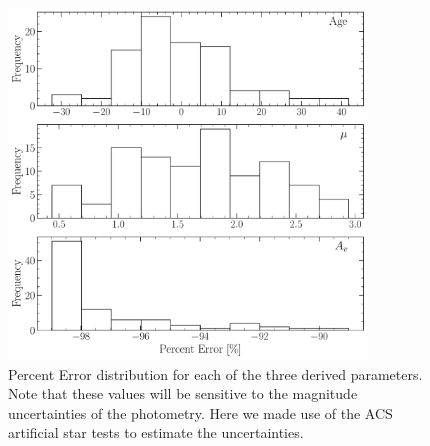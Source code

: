 \begin{figure}
  \centering
  \includegraphics[width=0.85\textwidth]{figures/ngc2808/DistributionOfErrors.pdf}
  \caption{Percent Error distribution for each of the three derived parameters.
  Note that these values will be sensitive to the magnitude uncertainties of
  the photometry. Here we made use of the ACS artificial star tests to estimate
  the uncertainties.}
  \label{fig:validationDist}
\end{figure}
